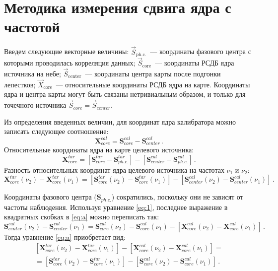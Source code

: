 \section{Методика измерения сдвига ядра с частотой}

Введем следующие векторные величины: $\vec{S}_\mathrm{ph.c.}$~--- координаты фазового центра с
которыми проводилась корреляция данных; $\vec{S}_\mathrm{core}$~--- координаты РСДБ ядра источника
на небе; $\vec{S}_\mathrm{center}$~--- координаты центра карты после подгонки лепестков;
$\vec{X}_\mathrm{core}$~--- относительные координаты РСДБ ядра на карте. Координаты ядра и центра
карты могут быть связаны нетривиальным образом, и только для точечного источника
$\vec{S}_{core} = \vec{S}_{center}$.

Из определения введенных величин, для координат ядра калибратора можно записать следующее
соотношение:
\begin{equation}
 \label{eq:1}
 \mathbf{X}_{core}^{cal} = \mathbf{S}_{core}^{cal} - \mathbf{S}_{center}^{cal} \,\text{.}
\end{equation}
Относительные координаты ядра на карте целевого источника:
\begin{equation}
 \mathbf{X}_{core}^{tar} = [\mathbf{S}_{core}^{tar} - \mathbf{S}_{ph.c.}^{tar}] -
 [\mathbf{S}_{center}^{cal} - \mathbf{S}_{ph.c.}^{cal}] \,\text{.}
\end{equation}
Разность относительных координат ядра целевого источника на частотах $\nu_1$ и $\nu_2$:
\begin{equation}
 \label{eq:a}
 \mathbf{X}_{core}^{tar}(\nu_2) - \mathbf{X}_{core}^{tar}(\nu_1) =
 [\mathbf{S}_{core}^{tar}(\nu_2) - \mathbf{S}_{core}^{tar}(\nu_1)] -
 [\mathbf{S}_{center}^{cal}(\nu_2) - \mathbf{S}_{center}^{cal}(\nu_1)] \,\text{.}
\end{equation}

Координаты фазового центра ($\mathbf{S}_{ph.c.}$) сократились, поскольку они не зависят от частоты
наблюдения. Используя уравнение \eqref{eq:1}, последнее выражение в квадратных скобках в
\eqref{eq:a} можно переписать так:
\begin{equation}
 \mathbf{S}_{center}^{cal}(\nu_2) - \mathbf{S}_{center}^{cal}(\nu_1) =
 \mathbf{S}_{core}^{cal}(\nu_2) - \mathbf{S}_{core}^{cal}(\nu_1) -
 [\mathbf{X}_{core}^{cal}(\nu_2) - \mathbf{X}_{core}^{cal}(\nu_1)] \,\text{.}
\end{equation}
Тогда уравнение \eqref{eq:a} приобретает вид:
\begin{multline}
 \label{eq:b}
 [\mathbf{X}_{core}^{tar}(\nu_2) - \mathbf{X}_{core}^{tar}(\nu_1)] -
 [\mathbf{X}_{core}^{cal}(\nu_2) - \mathbf{X}_{core}^{cal}(\nu_1)] =\\
 = [\mathbf{S}_{core}^{tar}(\nu_2) - \mathbf{S}_{core}^{tar}(\nu_1)] -
 [\mathbf{S}_{core}^{cal}(\nu_2) - \mathbf{S}_{core}^{cal}(\nu_1)] \,\text{.}
\end{multline}

